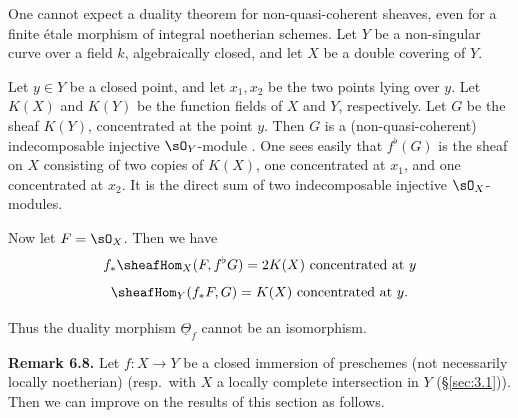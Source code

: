 \begin{example*}
One cannot expect a duality theorem for non-quasi-coherent sheaves, even for a finite \'etale morphism of integral noetherian schemes. Let $Y$ be a non-singular curve over a field $k$, algebraically closed, and let $X$ be a double covering of $Y$.
\begin{center}


\end{center}
Let $y\in Y$ be a closed point, and let $x_1,x_2$ be the two points lying over $y$. Let $K(X)$ and $K(Y)$ be the function fields of $X$ and $Y$, respectively. Let $G$ be the sheaf $K(Y)$, concentrated at the point $y$. Then $G$ is a (non-quasi-coherent) indecomposable injective $\sO_Y$-module . One sees easily that $f^{\flat}(G)$ is the sheaf on $X$ consisting of two copies of $K(X)$, one concentrated at $x_1$, and one concentrated at $x_2$. It is the direct sum of two indecomposable injective $\sO_X$-modules.

Now let $F=\sO_X$. Then we have
\[
f_*\sheafHom_X(F, f^{\flat}G) = 2K(X) \text{ concentrated at } y
\]
\[
\sheafHom_Y(f_*F,G) = K(X) \text{ concentrated at } y.
\]

Thus the duality morphism $\underline{\Theta}_f$ cannot be an isomorphism.
\end{example*}

\textbf{Remark 6.8.}\label{rem:3.6.8}
Let $f\colon X\to Y$ be a closed immersion of preschemes (not necessarily locally noetherian) (resp.\ with $X$ a locally complete intersection in $Y$ (\S\ref{sec:3.1})). Then we can improve on the results of this section as follows.

